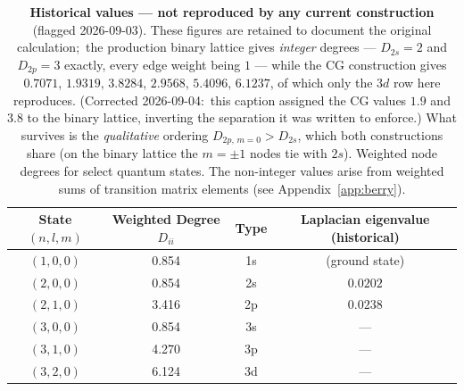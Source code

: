 \documentclass[aps,pra,twocolumn,superscriptaddress,longbibliography]{revtex4-2}
\begin{document}
\begin{table}[h]
\centering
\caption{\textbf{Historical values --- not reproduced by any current construction} (flagged 2026-09-03).  These figures are retained to document the original calculation;\ the production binary lattice gives \emph{integer} degrees --- $D_{2s} = 2$ and $D_{2p} = 3$ exactly, every edge weight being $1$ --- while the CG construction gives $0.7071$, $1.9319$, $3.8284$, $2.9568$, $5.4096$, $6.1237$, of which only the $3d$ row here reproduces.  (Corrected 2026-09-04:\ this caption assigned the CG values $1.9$ and $3.8$ to the binary lattice, inverting the separation it was written to enforce.)  What survives is the \emph{qualitative} ordering $D_{2p,\,m=0} > D_{2s}$, which both constructions share (on the binary lattice the $m = \pm1$ nodes tie with $2s$).  Weighted node degrees for select quantum states. The non-integer values arise from weighted sums of transition matrix elements (see Appendix~\ref{app:berry}).}
\begin{tabular}{cccc}
\hline
State $(n,l,m)$ & Weighted Degree $D_{ii}$ & Type & Laplacian eigenvalue (historical) \\
\hline
$(1,0,0)$ & 0.854 & 1s & (ground state) \\
$(2,0,0)$ & 0.854 & 2s & $0.0202$ \\
$(2,1,0)$ & 3.416 & 2p & $0.0238$ \\
$(3,0,0)$ & 0.854 & 3s & --- \\
$(3,1,0)$ & 4.270 & 3p & --- \\
$(3,2,0)$ & 6.124 & 3d & --- \\
\hline
\end{tabular}
\label{tab:degrees}
\end{table}

\end{document}
